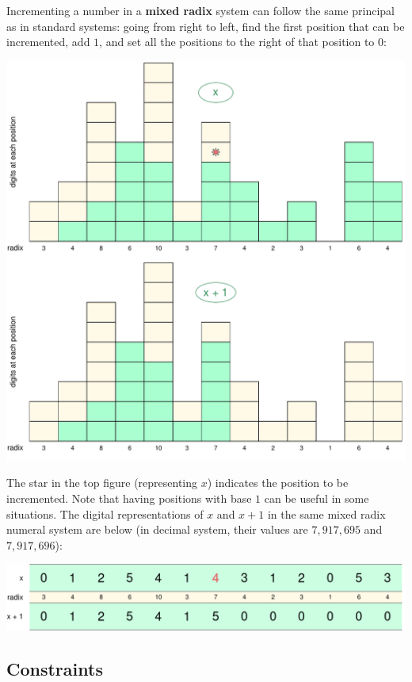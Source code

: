 \documentclass[12pt]{article}
\begin{document}
Incrementing a number in a \textbf{mixed radix} system can follow the same principal as in standard systems: going from right to left, find the first position that can be incremented, add $1$, and set all the positions to the right of that position to $0$: 
\begin{center}
  \includegraphics[scale = 0.52]{suppl/incr2.pdf} 
\end{center}

The star in the top figure (representing $x$) indicates the position to be incremented. Note that having positions with base $1$ can be useful in some situations. The digital representations of $x$ and $x + 1$ in the same mixed radix numeral system are below (in decimal system, their values are $7,917,695$ and $7,917,696$): 
\begin{center}
  \includegraphics[scale = 0.52]{suppl/incr3b.pdf}
\end{center}
\vspace{2mm} 

\subsection*{Constraints}
\end{document}
